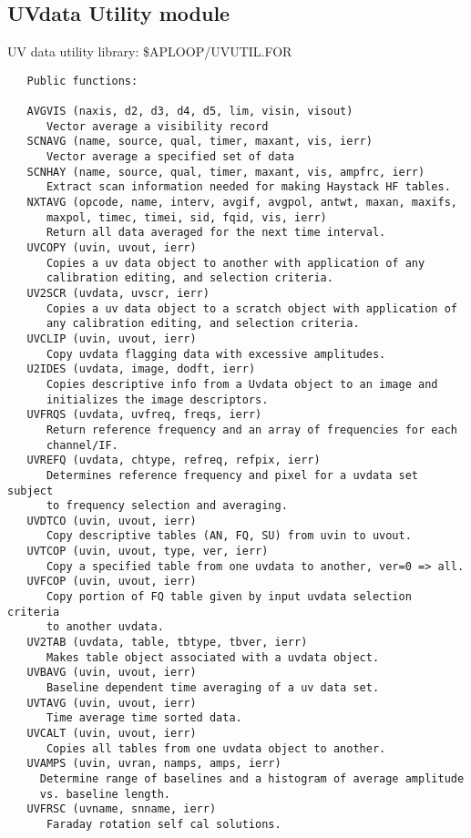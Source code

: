 \subsection{UVdata Utility module}
   UV data utility library: \$APLOOP/UVUTIL.FOR
{\small\begin{verbatim}
   Public functions:

   AVGVIS (naxis, d2, d3, d4, d5, lim, visin, visout)
      Vector average a visibility record
   SCNAVG (name, source, qual, timer, maxant, vis, ierr)
      Vector average a specified set of data
   SCNHAY (name, source, qual, timer, maxant, vis, ampfrc, ierr)
      Extract scan information needed for making Haystack HF tables.
   NXTAVG (opcode, name, interv, avgif, avgpol, antwt, maxan, maxifs,
      maxpol, timec, timei, sid, fqid, vis, ierr)
      Return all data averaged for the next time interval.
   UVCOPY (uvin, uvout, ierr)
      Copies a uv data object to another with application of any
      calibration editing, and selection criteria.
   UV2SCR (uvdata, uvscr, ierr)
      Copies a uv data object to a scratch object with application of
      any calibration editing, and selection criteria.
   UVCLIP (uvin, uvout, ierr)
      Copy uvdata flagging data with excessive amplitudes.
   U2IDES (uvdata, image, dodft, ierr)
      Copies descriptive info from a Uvdata object to an image and
      initializes the image descriptors.
   UVFRQS (uvdata, uvfreq, freqs, ierr)
      Return reference frequency and an array of frequencies for each
      channel/IF.
   UVREFQ (uvdata, chtype, refreq, refpix, ierr)
      Determines reference frequency and pixel for a uvdata set subject
      to frequency selection and averaging.
   UVDTCO (uvin, uvout, ierr)
      Copy descriptive tables (AN, FQ, SU) from uvin to uvout.
   UVTCOP (uvin, uvout, type, ver, ierr)
      Copy a specified table from one uvdata to another, ver=0 => all.
   UVFCOP (uvin, uvout, ierr)
      Copy portion of FQ table given by input uvdata selection criteria
      to another uvdata.
   UV2TAB (uvdata, table, tbtype, tbver, ierr)
      Makes table object associated with a uvdata object.
   UVBAVG (uvin, uvout, ierr)
      Baseline dependent time averaging of a uv data set.
   UVTAVG (uvin, uvout, ierr)
      Time average time sorted data.
   UVCALT (uvin, uvout, ierr)
      Copies all tables from one uvdata object to another.
   UVAMPS (uvin, uvran, namps, amps, ierr)
     Determine range of baselines and a histogram of average amplitude
     vs. baseline length.
   UVFRSC (uvname, snname, ierr)
      Faraday rotation self cal solutions.


\end{verbatim}}
